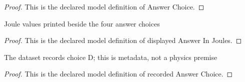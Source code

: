 \begin{proof}
  This is the declared model definition of Answer Choice.
\end{proof}
\begin{definition}
  \label{def:physics:phyx-mini-0494:phyxminiproblems-problemphyxmini0494-displayedanswerinjoules}
  Joule values printed beside the four answer choices
\end{definition}
\begin{proof}
  This is the declared model definition of displayed Answer In Joules.
\end{proof}
\begin{definition}
  \label{def:physics:phyx-mini-0494:phyxminiproblems-problemphyxmini0494-recordedanswerchoice}
  The dataset records choice D; this is metadata, not a physics premise
\end{definition}
\begin{proof}
  This is the declared model definition of recorded Answer Choice.
\end{proof}
